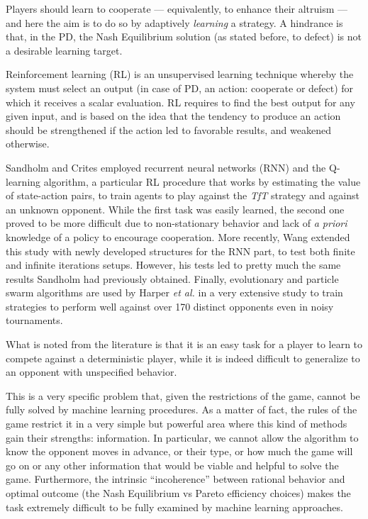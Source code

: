 \documentclass[journal,10pt,twoside]{IEEEtran}
\begin{document}
Players should learn to cooperate --- equivalently, to enhance their altruism --- and here the aim is to do so by adaptively \textit{learning} a strategy. A hindrance is that, in the PD, the Nash Equilibrium solution (as stated before, to defect) is not a desirable learning target.~\cite{coopSeqRL}

Reinforcement learning (RL) is an unsupervised learning technique whereby the system must select an output (in case of PD, an action: cooperate or defect) for which it receives a scalar evaluation. RL requires to find the best output for any given input, and is based on the idea that the tendency to produce an action should be strengthened if the action led to favorable results, and weakened otherwise.~\cite{sandholmRL}

Sandholm and Crites \cite{sandholmRL} employed recurrent neural networks (RNN) and the Q-learning algorithm, a particular RL procedure that works by estimating the value of state-action pairs, to train agents to play against the \textit{TfT} strategy and against an unknown opponent. While the first task was easily learned, the second one proved to be more difficult due to non-stationary behavior and lack of \textit{a priori} knowledge of a policy to encourage cooperation.
More recently, Wang \cite{kedaoRL} extended this study with newly developed structures for the RNN part, to test both finite and infinite iterations setups. However, his tests led to pretty much the same results Sandholm had previously obtained.
Finally, evolutionary and particle swarm algorithms are used by Harper \textit{et al.} in a very extensive study \cite{plosRLdominant} to train strategies to perform well against over 170 distinct opponents even in noisy tournaments.

What is noted from the literature is that it is an easy task for a player to learn to compete against a deterministic player, while it is indeed difficult to generalize to an opponent with unspecified behavior.

This is a very specific problem that, given the restrictions of the game, cannot be fully solved by machine learning procedures. As a matter of fact, the rules of the game restrict it in a very simple but powerful area where this kind of methods gain their strengths: information. In particular, we cannot allow the algorithm to know the opponent moves in advance, or their type, or how much the game will go on or any other information that would be viable and helpful to solve the game. Furthermore, the intrinsic ``incoherence'' between rational behavior and optimal outcome (the Nash Equilibrium vs Pareto efficiency choices) makes the task extremely difficult to be fully examined by machine learning approaches.
\end{document}
